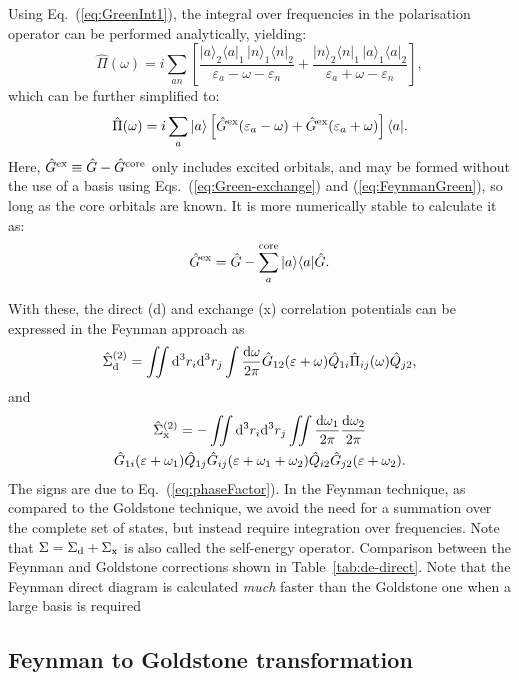 \documentclass[10pt,twocolumn,a4paper]{article}%
\newcommand{\bra}[1]{\ensuremath{\langle #1|}}	%
\newcommand{\ket}[1]{\ensuremath{|#1\rangle}}
\newcommand{\be}{\begin{equation}}
\newcommand{\ee}{\end{equation}}
\def\d{\ensuremath{{\rm d}}}
\def\en{\ensuremath{\varepsilon}}
\newcommand{\w}{\ensuremath{\omega}}
\begin{document}
Using Eq.~(\ref{eq:GreenInt1}), the integral over frequencies in the polarisation operator can be performed analytically, yielding:
\be\label{eq:PiGreen2}
\hat\Pi(\w) = i\sum_{an}\left[
\frac{\ket{a}_2\bra{a}_1 \, \ket{n}_1\bra{n}_2}{\en_a-\w-\en_n}
+
\frac{\ket{n}_2\bra{n}_1 \, \ket{a}_1\bra{a}_2}{\en_a+\w-\en_n}
\right],
\ee
which can be further simplified to:
\be\label{eq:PiGreen}
\hat\Pi(\w) = i\sum_a \ket{a}\left[\hat G^{\rm ex}(\en_a -\w) +  \hat G^{\rm ex}(\en_a +\w)\right]\bra{a}.
\ee
Here, $\hat G^{\rm ex}\equiv\hat G-\hat G^{\rm core}$ only includes excited orbitals, and may be formed without the use of a basis using Eqs.~(\ref{eq:Green-exchange}) and (\ref{eq:FeynmanGreen}), so long as the core orbitals are known.
It is more numerically stable to calculate it as:
\be\label{eq:Gex}
\hat G^{\rm ex} =  \hat G - \sum_a^{\rm core} \ket{a}\bra{a}\hat G.
\ee


With these, the direct (d) and exchange (x) correlation potentials can be expressed in the Feynman approach as
\be\label{eq:FeynDir}
\hat\Sigma^{(2)}_{\rm d}
= \iint\d^3 r_i\d^3 r_j
\int\frac{\d\w}{2\pi}\hat G_{12}(\en+\w)\hat Q_{1i}\hat\Pi_{ij}(\w)\hat Q_{j2},
\ee
and
\begin{multline}\label{eq:FeynExch}
\hat\Sigma^{(2)}_{\rm x}
= -\iint\d^3 r_i\d^3 r_j
\iint\frac{\d\w_1}{2\pi}\frac{\d\w_2}{2\pi}\\
\hat G_{1i}(\en+\w_1)\hat Q_{1j} \hat G_{ij}(\en+\w_1+\w_2)\hat Q_{i2}\hat G_{j2}(\en+\w_2).
\end{multline}
The signs are due to Eq.~(\ref{eq:phaseFactor}).
In the Feynman technique, as compared to the Goldstone technique, we avoid the need for a summation over the complete set of states, but instead require integration over frequencies.
Note that $\Sigma = \Sigma_{\rm d} + \Sigma_{\rm x}$ is also called the self-energy operator.
Comparison between the Feynman and Goldstone corrections shown in Table~\ref{tab:de-direct}.
Note that the Feynman direct diagram is calculated {\em much} faster than the Goldstone one when a large basis is required




\subsection{Feynman to Goldstone transformation}
\end{document}
